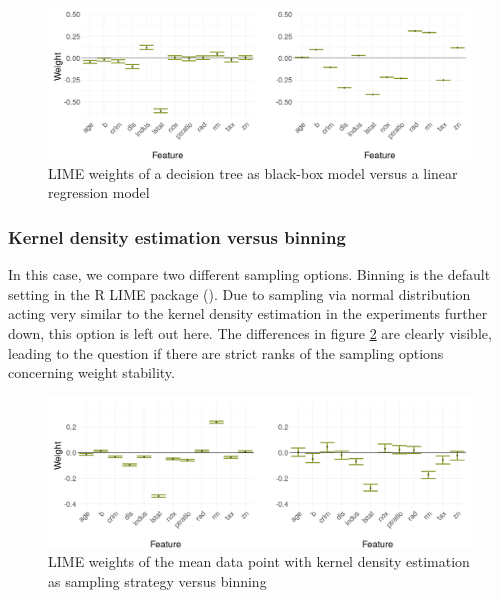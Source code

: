 \documentclass[
]{krantz}
\begin{document}
\begin{figure}

{\centering \includegraphics[width=19.44in]{images/boston_treeVSlm} 

}

\caption{LIME weights of a decision tree as black-box model versus a linear regression model}\label{fig:figbosttreelm}
\end{figure}

\hypertarget{kernel-density-estimation-versus-binning}{%
\subsubsection{Kernel density estimation versus binning}\label{kernel-density-estimation-versus-binning}}

In this case, we compare two different sampling options.
Binning is the default setting in the R LIME package (\citet{thomasp85lime}).
Due to sampling via normal distribution acting very similar to the kernel density estimation in the experiments further down, this option is left out here.
The differences in figure \ref{fig:figbostkdebin} are clearly visible, leading to the question if there are strict ranks of the sampling options concerning weight stability.

\begin{figure}

{\centering \includegraphics[width=19.44in]{images/boston_kdeVSbins} 

}

\caption{LIME weights of the mean data point with kernel density estimation as sampling strategy versus binning}\label{fig:figbostkdebin}
\end{figure}
\end{document}
